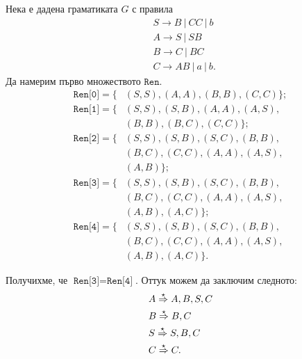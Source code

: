 \begin{extra}
\begin{multicols}{2}
    \begin{example}
      Нека е дадена граматиката $G$ с правила  
      \begin{align*}
        & S \to B\ |\ CC\ |\ b\\
        & A \to S\ |\ SB\\
        & B \to C\ |\ BC\\
        & C \to AB\ |\ a\ |\ b.
      \end{align*}
      Да намерим първо множеството $\texttt{Ren}$.
      \begin{align*}
        \texttt{Ren[0]} = \{ & (S,S), (A,A), (B,B), (C,C)\};\\
        \texttt{Ren[1]} = \{ & (S,S), (S,B), (A,A), (A,S),\\
                             & (B,B), (B,C), (C,C)\};\\
        \texttt{Ren[2]} = \{ & (S,S),(S,B), (S,C), (B,B),\\
                             & (B,C), (C,C), (A,A), (A,S),\\
                             & (A,B)\};\\
        \texttt{Ren[3]} = \{ & (S,S),(S,B), (S,C), (B,B),\\
                             & (B,C), (C,C), (A,A), (A,S),\\
                             & (A,B), (A,C)\};\\
        \texttt{Ren[4]} = \{ & (S,S),(S,B), (S,C), (B,B),\\
                             & (B,C), (C,C), (A,A), (A,S),\\
                             & (A,B), (A,C)\}.
      \end{align*}
      
      Получихме, че $\texttt{Ren[3]} = \texttt{Ren[4]}$.
      Оттук можем да заключим следното:
      \begin{align*}
        & A \stackrel{{\star}}{\Rightarrow} A,B,S,C\\
        & B \stackrel{{\star}}{\Rightarrow} B,C\\
        & S \stackrel{{\star}}{\Rightarrow} S,B,C\\
        & C \stackrel{{\star}}{\Rightarrow} C.          
      \end{align*}
      

\end{example}
\end{multicols}
\end{extra}

